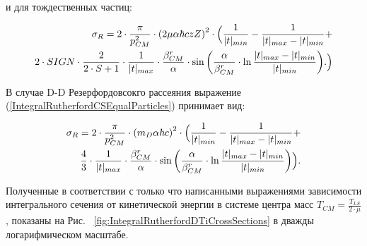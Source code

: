 \documentclass[a4paper,12pt]{article}
\begin{document}
\begin{large}
	и для тождественных частиц:
	
\begin{equation}
\label{IntegralRutherfordCSEqualParticles}
\begin{aligned} 
  \sigma_R = 2 \cdot \frac{\pi}{p^2_{CM}} \cdot \left( 2 \mu \alpha \hbar c z Z \right)^2 \cdot               \Bigl( \frac{1}{|t|_{min}} - \frac{1}{|t|_{max} - |t|_{min}} + \\
  2 \cdot SIGN \cdot \frac{2}{2 \cdot S+1} \cdot
  \frac{1}{|t|_{max}} \cdot \frac{\beta^r_{CM}}{\alpha}
  \cdot \sin{ \left( \frac{\alpha}{\beta^r_{CM}}
  \cdot \ln{ \frac{|t|_{max} - |t|_{min}}{|t|_{min}} } \right)}.
\Bigr)
\end{aligned}
\end{equation}

	В случае D-D Резерфордовсокго рассеяния выражение (\ref{IntegralRutherfordCSEqualParticles}) принимает вид:
	
\begin{equation}
\label{IntegralRutherfordCSEqualDD}
\begin{aligned} 
  \sigma_R = 2 \cdot \frac{\pi}{p^2_{CM}} \cdot \left( m_D \alpha \hbar c\right)^2 \cdot               \Bigl( \frac{1}{|t|_{min}} - \frac{1}{|t|_{max} - |t|_{min}} + \\
  \frac{4}{3} \cdot
  \frac{1}{|t|_{max}} \cdot \frac{\beta^r_{CM}}{\alpha}
  \cdot \sin{ \left( \frac{\alpha}{\beta^r_{CM}}
  \cdot \ln{ \frac{|t|_{max} - |t|_{min}}{|t|_{min}} } \right)}
\Bigr).
\end{aligned}
\end{equation}

	Полученные в соответствии с только что написанными выражениями зависимости интегрального сечения от кинетической энергии в системе центра масс $T_{CM}=\frac{T_{LS}}{2\cdot \mu}$, показаны на Рис. ~\ref{fig:IntegralRutherfordDTiCrossSections} в дважды логарифмическом масштабе.


\end{large}
\end{document}
